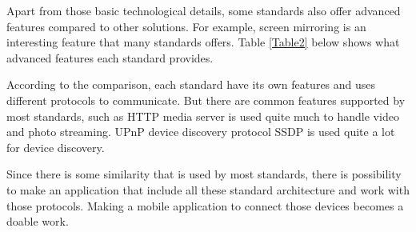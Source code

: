 \begin{enumerate}
Apart from those basic technological details, some standards also offer advanced 
features compared to other solutions. For example, screen mirroring is an 
interesting feature that many standards offers. Table \ref{Table2} below shows 
what advanced features each standard provides. 
\begin{table}[htb] 
\caption{Advanced feature comparison \label{Table2}} 
\begin{center} 
\end{center} 
\end{table} 


\end{enumerate} 

According to the comparison, each standard have its own features and uses 
different protocols to communicate. But there are common features supported by 
most standards, such as HTTP media server is used quite much to handle video 
and photo streaming. UPnP device discovery protocol SSDP is used quite a lot 
for device discovery. 

Since there is some similarity that is used by most standards, there is 
possibility to make an application that include all these standard 
architecture and work with those protocols. 
Making a mobile application to connect those devices becomes a doable work.
